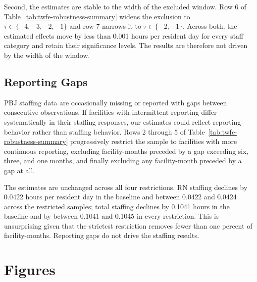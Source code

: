 \documentclass[12pt]{article}
\begin{document}
Second, the estimates are stable to the width of the excluded window. Row 6 of Table~\ref{tab:twfe-robustness-summary} widens the exclusion to $\tau\in\{-4,-3,-2,-1\}$ and row 7 narrows it to $\tau\in\{-2,-1\}$. Across both, the estimated effects move by less than 0.001 hours per resident day for every staff category and retain their significance levels. The results are therefore not driven by the width of the window.

\subsection{Reporting Gaps}

PBJ staffing data are occasionally missing or reported with gaps between consecutive observations. If facilities with intermittent reporting differ systematically in their staffing responses, our estimates could reflect reporting behavior rather than staffing behavior. Rows 2 through 5 of Table~\ref{tab:twfe-robustness-summary} progressively restrict the sample to facilities with more continuous reporting, excluding facility-months preceded by a gap exceeding six, three, and one months, and finally excluding any facility-month preceded by a gap at all.

The estimates are unchanged across all four restrictions. RN staffing declines by 0.0422 hours per resident day in the baseline and between 0.0422 and 0.0424 across the restricted samples; total staffing declines by 0.1041 hours in the baseline and by between 0.1041 and 0.1045 in every restriction. This is unsurprising given that the strictest restriction removes fewer than one percent of facility-months. Reporting gaps do not drive the staffing results.

\section*{Figures} \label{sec:fig}

\end{document}
